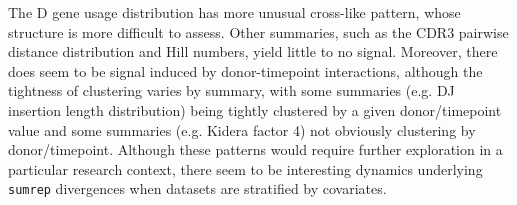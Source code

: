 \documentclass{article}
\begin{document}
The D gene usage distribution has more unusual cross-like pattern, whose structure is more difficult to assess.
Other summaries, such as the CDR3 pairwise distance distribution and Hill numbers, yield little to no signal.
Moreover, there does seem to be signal induced by donor-timepoint interactions, although the tightness of clustering varies by summary, with some summaries (e.g. DJ insertion length distribution) being tightly clustered by a given donor/timepoint value and some summaries (e.g. Kidera factor 4) not obviously clustering by donor/timepoint.
Although these patterns would require further exploration in a particular research context, there seem to be interesting dynamics underlying \texttt{sumrep} divergences when datasets are stratified by covariates.
\end{document}
